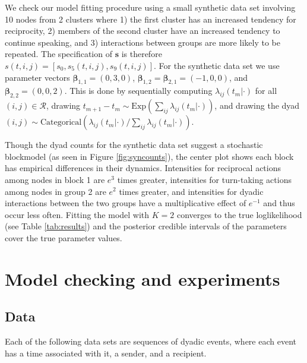 \documentclass{article}
\begin{document}
We check our model fitting procedure using a small synthetic data set involving 10 nodes from 2 clusters where 1) the first cluster has an increased tendency for reciprocity, 2) members of the second cluster have an increased tendency to continue speaking, and 3) interactions between groups are more likely to be repeated.  The specification of $\textbf{s}$ is therefore $s(t,i,j) = [s_0, s_{5}(t,i,j), s_{9}(t,i,j)]$.  For the synthetic data set we use parameter vectors $\boldsymbol{\beta}_{1,1} = (0,3,0)$,  $\boldsymbol{\beta}_{1,2} = \boldsymbol{\beta}_{2,1} = (-1,0,0)$, and $\boldsymbol{\beta}_{2,2} = (0,0,2)$.  This is done by sequentially computing $\lambda_{ij}(t_m|\cdot)$ for all $(i,j) \in \mathcal{R}$, drawing $t_{m+1}-t_m \sim \mbox{Exp}(\sum_{ij} \lambda_{ij}(t_m|\cdot))$, and drawing the dyad $(i,j) \sim \mbox{Categorical}(\lambda_{ij}(t_m|\cdot) / \sum_{ij}\lambda_{ij}(t_m|\cdot))$.  

Though the dyad counts for the synthetic data set suggest a stochastic blockmodel (as seen in Figure  \ref{fig:syncounts}),  the center plot shows each block has empirical differences in their dynamics.  Intensities for reciprocal actions among nodes in block 1 are $e^3$ times greater, intensities for turn-taking actions among nodes in group 2 are $e^2$ times greater, and intensities for dyadic interactions between the two groups have a multiplicative effect of $e^{-1}$ and thus occur less often.  Fitting the model with $K=2$ converges to the true loglikelihood (see Table \ref{tab:results}) and the posterior credible intervals of the parameters cover the true parameter values.

\section{Model checking and experiments}

\subsection{Data}

Each of the following data sets are sequences of dyadic events, where each event has a time associated with it, a sender, and a recipient.
\end{document}
